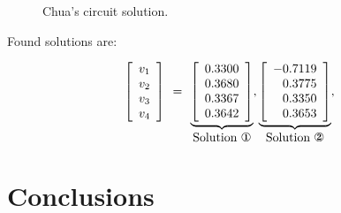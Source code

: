 \documentclass[conference,letterpaper,onecolumn]{IEEEtran}
\begin{document}
{\begin{figure}[hbtp]
\centerline{
\epsfxsize=60mm
\epsfxsize=60mm
}
\caption{Chua's circuit solution.}
\label{chuaf}
\end{figure}

Found solutions are:

\begin{displaymath}
\begin{array}{r}
\left[\begin{array}{r}
v_1 \\ v_2  \\ v_3  \\ v_4  \\
\end{array}\right]
\begin{array}{r}
 \\ = \\ \\ \end{array}
\underbrace{\left[\begin{array}{r}
0.3300 \\ 0.3680 \\ 0.3367 \\ 0.3642 \\
\end{array}\right]}_{\mbox{Solution \ding{172}}},
\underbrace{\left[\begin{array}{r}
 -0.7119 \\ 0.3775 \\ 0.3350 \\ 0.3653 \\
\end{array}\right]}_{\mbox{Solution \ding{173}}},
\end{array}
\end{displaymath}

\section{Conclusions}

}
\end{document}
